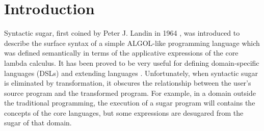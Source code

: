\section{Introduction}









Syntactic sugar, first coined by Peter J. Landin in 1964 \cite{syntacticsugar}, was introduced to describe the surface syntax of a simple ALGOL-like programming language which was defined semantically in terms of the applicative expressions of the core lambda calculus. It has been proved to be very useful for defining domain-specific languages (DSLs) and extending languages \cite{FellFFKBMT18,CulpFFK19}.
Unfortunately, when syntactic sugar is eliminated by transformation, it obscures the relationship between the user’s source program and the transformed program. For example, in a domain outside the traditional programming, the execution of a sugar program will contains the concepts of the core languages, but some expressions are desugared from the sugar of that domain.

